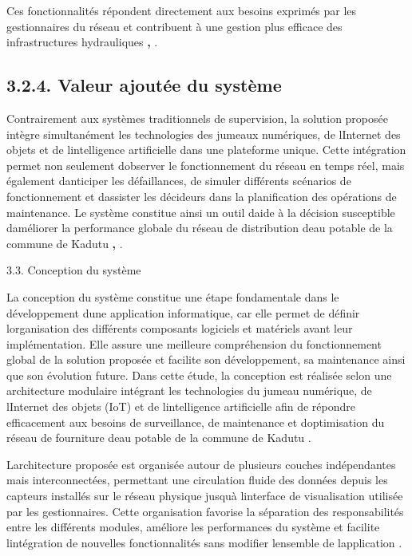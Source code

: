 \documentclass[12pt,a4paper,oneside]{report}
\begin{document}
Ces fonctionnalités répondent directement aux besoins exprimés par les
gestionnaires du réseau et contribuent à une gestion plus efficace des
infrastructures hydrauliques \cite{ref106}\textbf{,} \cite{ref20}.

\subsection{\texorpdfstring{\textbf{3.2.4. Valeur ajoutée du
système}}{3.2.4. Valeur ajoutée du système}}\label{valeur-ajoutuxe9e-du-systuxe8me}

Contrairement aux systèmes traditionnels de supervision, la solution
proposée intègre simultanément les technologies des jumeaux numériques,
de l\textquotesingle Internet des objets et de
l\textquotesingle intelligence artificielle dans une plateforme unique.
Cette intégration permet non seulement d\textquotesingle observer le
fonctionnement du réseau en temps réel, mais également
d\textquotesingle anticiper les défaillances, de simuler différents
scénarios de fonctionnement et d\textquotesingle assister les décideurs
dans la planification des opérations de maintenance. Le système
constitue ainsi un outil d\textquotesingle aide à la décision
susceptible d\textquotesingle améliorer la performance globale du réseau
de distribution d\textquotesingle eau potable de la commune de Kadutu
\cite{ref17}\textbf{,} \cite{ref114}.

3.3. Conception du système

La conception du système constitue une étape fondamentale dans le
développement d\textquotesingle une application informatique, car elle
permet de définir l\textquotesingle organisation des différents
composants logiciels et matériels avant leur implémentation. Elle assure
une meilleure compréhension du fonctionnement global de la solution
proposée et facilite son développement, sa maintenance ainsi que son
évolution future. Dans cette étude, la conception est réalisée selon une
architecture modulaire intégrant les technologies du jumeau numérique,
de l\textquotesingle Internet des objets (IoT) et de
l\textquotesingle intelligence artificielle afin de répondre
efficacement aux besoins de surveillance, de maintenance et
d\textquotesingle optimisation du réseau de fourniture
d\textquotesingle eau potable de la commune de Kadutu \cite{ref106}.

L\textquotesingle architecture proposée est organisée autour de
plusieurs couches indépendantes mais interconnectées, permettant une
circulation fluide des données depuis les capteurs installés sur le
réseau physique jusqu\textquotesingle à l\textquotesingle interface de
visualisation utilisée par les gestionnaires. Cette organisation
favorise la séparation des responsabilités entre les différents modules,
améliore les performances du système et facilite
l\textquotesingle intégration de nouvelles fonctionnalités sans modifier
l\textquotesingle ensemble de l\textquotesingle application \cite{ref114}.
\end{document}
